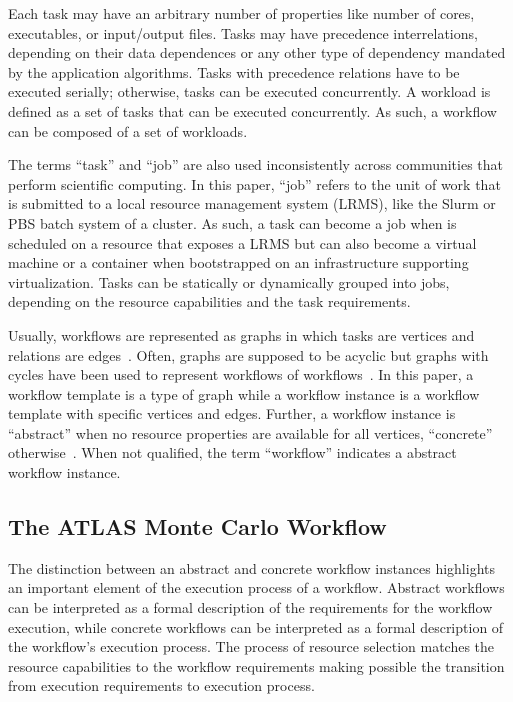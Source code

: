 Each task may have an arbitrary number of properties like number of cores,
executables, or input/output files. Tasks may have precedence interrelations,
depending on their data dependences or any other type of dependency mandated
by the application algorithms. Tasks with precedence relations have to be
executed serially; otherwise, tasks can be executed concurrently. A workload is
defined as a set of tasks that can be executed concurrently. As such, a
workflow can be composed of a set of workloads.

The terms ``task'' and ``job'' are also used inconsistently across communities
that perform scientific computing. In this paper, ``job'' refers to the unit of
work that is submitted to a local resource management system (LRMS), like the
Slurm or PBS batch system of a cluster. As such, a task can become a job when
is scheduled on a resource that exposes a LRMS but can also become a virtual
machine or a container when bootstrapped on an infrastructure supporting
virtualization. Tasks can be statically or dynamically grouped into jobs,
depending on the resource capabilities and the task requirements.

Usually, workflows are represented as graphs in which tasks are vertices and
relations are edges~\cite{}. Often, graphs are supposed to be acyclic but graphs
with cycles have been used to represent workflows of workflows~\cite{}. In this
paper, a workflow template is a type of graph while a workflow instance is a
workflow template with specific vertices and edges. Further, a workflow instance
is ``abstract'' when no resource properties are available for all vertices,
``concrete'' otherwise~\cite{}. When not qualified, the term ``workflow''
indicates a abstract workflow instance.

\subsection{The ATLAS Monte Carlo Workflow}

The distinction between an abstract and concrete workflow instances highlights
an important element of the execution process of a workflow. Abstract workflows
can be interpreted as a formal description of the requirements for the workflow
execution, while concrete workflows can be interpreted as a formal description
of the workflow's execution process. The process of resource selection matches
the resource capabilities to the workflow requirements making possible the
transition from execution requirements to execution process.

